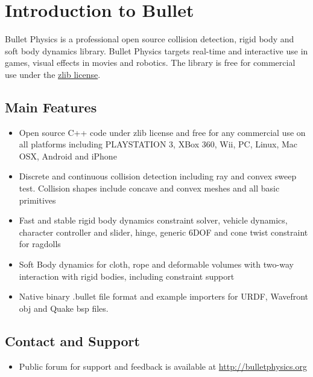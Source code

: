 

\chapter{Introduction to Bullet}
Bullet Physics is a professional open source collision detection, rigid body and soft body dynamics library. Bullet Physics targets real-time and interactive use in games, visual effects in movies and robotics. The library is free for commercial use under the  \href{http://opensource.org/licenses/zlib-license.php}{zlib license}.

\section{Main Features}

\begin{itemize}
	\item Open source C++ code under zlib license and free for any commercial use on all platforms including PLAYSTATION 3, XBox 360, Wii, PC, Linux, Mac OSX, Android and iPhone
	\item Discrete and continuous collision detection including ray and convex sweep test. Collision shapes include concave and convex meshes and all basic primitives
	\item Fast and stable rigid body dynamics constraint solver, vehicle dynamics, character controller and slider, hinge, generic 6DOF and cone twist constraint for ragdolls
	\item Soft Body dynamics for cloth, rope and deformable volumes with two-way interaction with rigid bodies, including constraint support
	\item Native binary .bullet file format and example importers for URDF, Wavefront obj and Quake bsp files.
\end{itemize}

\section{Contact and Support}
\begin{itemize}
	\item Public forum for support and feedback is available at \url{http://bulletphysics.org}
\end{itemize}

